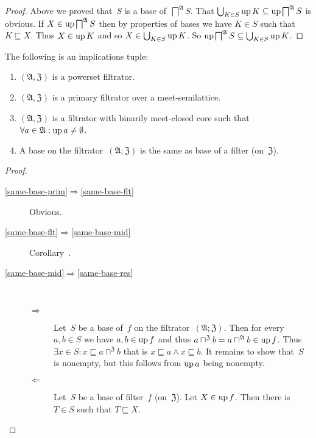 \begin{proof}
Above we proved that~$S$ is a base of~$\bigsqcap^{\mathfrak{A}} S$.
That $\bigcup_{K\in S}\operatorname{up} K \subseteq \operatorname{up} \bigsqcap^{\mathfrak{A}} S$ is obvious.
If $X\in\operatorname{up}\bigsqcap^{\mathfrak{A}} S$ then by properties of bases we have
$K\in S$ such that $K\sqsubseteq X$. Thus $X\in\operatorname{up} K$ and so $X\in\bigcup_{K\in S}\operatorname{up} K$.
So $\operatorname{up} \bigsqcap^{\mathfrak{A}} S \subseteq \bigcup_{K\in S}\operatorname{up} K$.
\end{proof}

\begin{prop}
The following is an implications tuple:
\begin{enumerate}
\item\label{same-base-prim} $(\mathfrak{A},\mathfrak{Z})$ is a powerset filtrator.
\item\label{same-base-flt} $(\mathfrak{A},\mathfrak{Z})$ is a primary filtrator over a meet-semilattice.
\item\label{same-base-mid} $(\mathfrak{A},\mathfrak{Z})$ is a filtrator with binarily meet-closed core such that
  $\forall a\in\mathfrak{A}:\operatorname{up} a\ne\emptyset$.
\item\label{same-base-res} A base on the filtrator~$(\mathfrak{A};\mathfrak{Z})$ is the same
as base of a filter (on~$\mathfrak{Z}$).
\end{enumerate}
\end{prop}

\begin{proof}
~
\begin{description}
\item[\ref{same-base-prim}$\Rightarrow$\ref{same-base-flt}] Obvious.

\item[\ref{same-base-flt}$\Rightarrow$\ref{same-base-mid}] Corollary~.

\item[\ref{same-base-mid}$\Rightarrow$\ref{same-base-res}] ~
  \begin{description}
  \item[$\Rightarrow$] Let~$S$ be a base of~$f$ on the filtrator~$(\mathfrak{A};\mathfrak{Z})$.
  Then for every $a,b\in S$ we have $a,b\in\operatorname{up} f$ and thus $a\sqcap^{\mathfrak{Z}}b=a\sqcap^{\mathfrak{A}}b\in\operatorname{up} f$.
  Thus $\exists x\in S:x\sqsubseteq a\sqcap^{\mathfrak{Z}}b$ that is $x\sqsubseteq a\land x\sqsubseteq b$.
  It remains to show that~$S$ is nonempty, but this follows from $\operatorname{up} a$ being nonempty.

  \item[$\Leftarrow$] Let~$S$ be a base of filter~$f$ (on~$\mathfrak{Z}$).
  Let $X\in\operatorname{up} f$. Then there is $T\in S$ such that $T\sqsubseteq X$.
  \end{description}
\end{description}
\end{proof}

